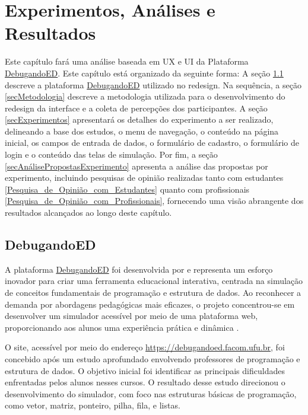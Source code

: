\chapter[Experimentos, Análises e Resultados]{Experimentos, Análises e Resultados}
\label{capExperimentos}

Este capítulo fará uma análise baseada em \acs{UX} e \acs{UI} da Plataforma \href{https://debugandoed.facom.ufu.br/}{DebugandoED}. Este capítulo está organizado da seguinte forma: A seção \ref{secDebugandoED} descreve a plataforma \href{https://debugandoed.facom.ufu.br/}{DebugandoED} utilizado no redesign. Na sequência, a seção \ref{secMetodologia} descreve a metodologia utilizada para o desenvolvimento do redesign da interface e a coleta de percepções dos participantes. A seção \ref{secExperimentos} apresentará os detalhes do experimento a ser realizado, delineando a base dos estudos, o menu de navegação, o conteúdo na página inicial, os campos de entrada de dados, o formulário de cadastro, o formulário de login e o conteúdo das telas de simulação. Por fim, a seção \ref{secAnálisePropostasExperimento} apresenta a análise das propostas por experimento, incluindo pesquisas de opinião realizadas tanto com estudantes \ref{Pesquisa_de_Opinião_com_Estudantes} quanto com profissionais \ref{Pesquisa_de_Opinião_com_Profissionais}, fornecendo uma visão abrangente dos resultados alcançados ao longo deste capítulo.

\section{DebugandoED}
\label{secDebugandoED}

A plataforma \href{https://debugandoed.facom.ufu.br/}{DebugandoED} foi desenvolvida por  e representa um esforço inovador para criar uma ferramenta educacional interativa, centrada na simulação de conceitos fundamentais de programação e estrutura de dados. Ao reconhecer a demanda por abordagens pedagógicas mais eficazes, o projeto concentrou-se em desenvolver um simulador acessível por meio de uma plataforma web, proporcionando aos alunos uma experiência prática e dinâmica \cite{debugandoedsbsi}.

O site, acessível por meio do endereço \href{https://debugandoed.facom.ufu.br}{https://debugandoed.facom.ufu.br}, foi concebido após um estudo aprofundado envolvendo professores de programação e estrutura de dados. O objetivo inicial foi identificar as principais dificuldades enfrentadas pelos alunos nesses cursos. O resultado desse estudo direcionou o desenvolvimento do simulador, com foco nas estruturas básicas de programação, como vetor, matriz, ponteiro, pilha, fila, e listas.

